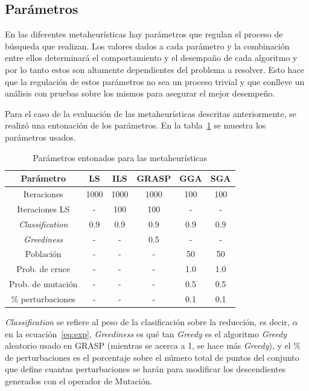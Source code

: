\documentclass{ci5652}
\begin{document}
\subsection{Parámetros}
En las diferentes metaheurísticas hay parámetros que regulan el proceso de búsqueda que realizan. Los valores dados a cada parámetro y la combinación entre ellos determinará el comportamiento y el desempaño de cada algoritmo y por lo tanto estos son altamente dependientes del problema a resolver. Esto hace que la regulación de estos parámetros no sea un proceso trivial y que conlleve un análisis con pruebas sobre los mismos para asegurar el mejor desempeño.

	Para el caso de la evaluación de las metaheurísticas descritas anteriormente, se realizó una entonación de los parámetros. En la tabla~\ref{table:parameters} se muestra los parámetros usados.  

\begin{table}[!h]
	\centering
	\begin{tabular}{c c c c c c}
	\hline
	Parámetro & LS & ILS & GRASP & GGA & SGA \\
	\hline
	Iteraciones & 1000 & 1000 & 1000 & 100 & 100 \\
	Iteraciones LS & - & 100 & 100 & - & - \\
	\textit{Classification} & 0.9 & 0.9 & 0.9 & 0.9 & 0.9 \\
	\textit{Greediness} & - & - & 0.5 & - & - \\
	Población & - & - & - & 50 & 50 \\
	Prob. de cruce & - & - & - & 1.0 & 1.0 \\
	Prob. de mutación & - & - & - & 0.5 & 0.5 \\
	\% perturbaciones & - & - & - & 0.1 & 0.1 \\
	\end{tabular}
	\caption{Parámetros entonados para las metaheurísticas}
	\label{table:parameters}
\end{table}

\textit{Classification} se refiere al peso de la clasificación sobre la reducción, es decir, $\alpha$ en la ecuación~\ref{eq:exp}, \textit{Greediness} es qué tan \textit{Greedy} es el algoritmo \textit{Greedy} aleatorio usado en GRASP (mientras se acerca a 1, se hace más \textit{Greedy}), y el \% de perturbaciones es el porcentaje sobre el número total de puntos del conjunto que define cuantas perturbaciones se harán para modificar los descendientes generados con el operador de Mutación.
\end{document}
